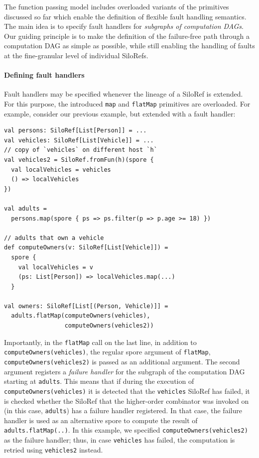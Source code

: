 \documentclass{jfp1}
\begin{document}
The function passing model includes overloaded variants of the primitives discussed so far which
enable the definition of flexible fault handling semantics. The main idea is to
specify fault handlers for \emph{subgraphs of computation DAGs}. Our guiding
principle is to make the definition of the failure-free path through a
computation DAG as simple as possible, while still enabling the handling of
faults at the fine-granular level of individual SiloRefs.

\paragraph{Defining fault handlers}

Fault handlers may be specified whenever the lineage of a SiloRef is extended.
For this purpose, the introduced \verb|map| and \verb|flatMap| primitives are
overloaded. For example, consider our previous example, but extended with a
fault handler:

\begin{lstlisting}
val persons: SiloRef[List[Person]] = ...
val vehicles: SiloRef[List[Vehicle]] = ...
// copy of `vehicles` on different host `h`
val vehicles2 = SiloRef.fromFun(h)(spore {
  val localVehicles = vehicles
  () => localVehicles
})

val adults =
  persons.map(spore { ps => ps.filter(p => p.age >= 18) })

// adults that own a vehicle
def computeOwners(v: SiloRef[List[Vehicle]]) =
  spore {
    val localVehicles = v
    (ps: List[Person]) => localVehicles.map(...)
  }

val owners: SiloRef[List[(Person, Vehicle)]] =
  adults.flatMap(computeOwners(vehicles),
                 computeOwners(vehicles2))
\end{lstlisting}

Importantly, in the \verb|flatMap| call on the last line, in addition to
\verb|computeOwners(vehicles)|, the regular spore argument of \verb|flatMap|,
\verb|computeOwners(vehicles2)| is passed as an additional argument. The second
argument registers a \emph{failure handler} for the subgraph of the computation
DAG starting at \verb|adults|. This means that if during the execution of
\verb|computeOwners(vehicles)| it is detected that the \verb|vehicles| SiloRef
has failed, it is checked whether the SiloRef that the higher-order combinator
was invoked on (in this case, \verb|adults|) has a failure handler registered.
In that case, the failure handler is used as an alternative spore to compute
the result of \verb|adults.flatMap(..)|. In this example, we specified
\verb|computeOwners(vehicles2)| as the failure handler; thus, in case
\verb|vehicles| has failed, the computation is retried using \verb|vehicles2|
instead.
\end{document}
